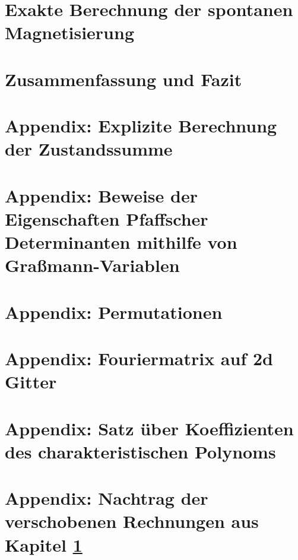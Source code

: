 \documentclass[fontsize = 12pt]{scrartcl}
\numberwithin{equation}{section}
\begin{document}
\section{Exakte Berechnung der spontanen Magnetisierung} \label{sec: calcM}
    

\section{Zusammenfassung und Fazit} \label{sec: conclusion} \label{sec: conclusio}
    

\newpage 

\appendix

\section{Appendix: Explizite Berechnung der Zustandssumme}
    \label{Appendix: Zustandsumme}
    
    \newpage 
\section{Appendix: Beweise der Eigenschaften Pfaffscher Determinanten mithilfe von Graßmann-Variablen}
    \label{Appendix: Pfaffians with GV}
    
    \newpage 
\section{Appendix: Permutationen}
    \label{Apenndix: Permutationen}
    
    \newpage 
\section{Appendix: Fouriermatrix auf 2d Gitter }
    \label{Appendix: Det Fouerier}
    
    \newpage 
\section{Appendix: Satz über Koeffizienten des charakteristischen Polynoms }
    \label{appendix: Satz über Koeffizienten des Charakteristischen Polynoms}
    
    \newpage 
\section{Appendix: Nachtrag der verschobenen Rechnungen aus Kapitel \ref{sec: calcM} }
    \label{Appendix: Nachtrag Rechnung}
    
    \newpage 

    
    

\newpage



\end{document}
